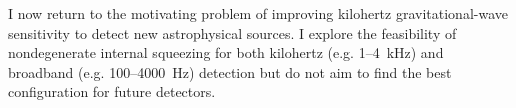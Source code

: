 I now return to the motivating problem of improving kilohertz gravitational-wave sensitivity to detect new astrophysical sources. I explore the feasibility of nondegenerate internal squeezing for both kilohertz (e.g. 1--4~kHz) and broadband (e.g. 100--4000~Hz) detection but do not aim to find the best configuration for future detectors. %


\label{sec:nIS_kHz}

